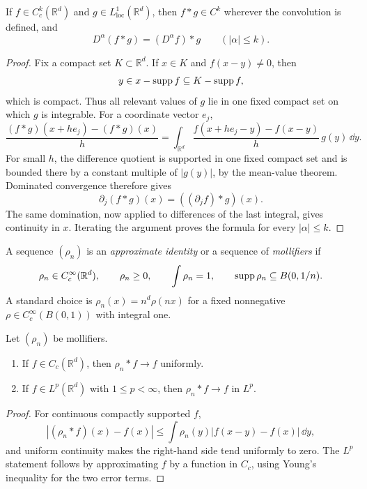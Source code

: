 \begin{noteproposition}
If $f\in C_c^k(\mathbb R^d)$ and $g\in L^1_{\mathrm{loc}}(\mathbb R^d)$,
then $f*g\in C^k$ wherever the convolution is defined, and
\[
  D^\alpha(f*g)=(D^\alpha f)*g
  \qquad(|\alpha|\le k).
\]
\end{noteproposition}

\begin{proof}
Fix a compact set $K\subset\mathbb R^d$.  If $x\in K$ and
$f(x-y)\ne0$, then
\[
  y\in x-\operatorname{supp} f\subseteq K-\operatorname{supp} f,
\]
which is compact.  Thus all relevant values of $g$ lie in one fixed compact
set on which $g$ is integrable.  For a coordinate vector $e_j$,
\[
  \frac{(f*g)(x+he_j)-(f*g)(x)}{h}
  =\int_{\mathbb R^d}
     \frac{f(x+he_j-y)-f(x-y)}{h}\,g(y)\,\dd y.
\]
For small $h$, the difference quotient is supported in one fixed compact set
and is bounded there by a constant multiple of $|g(y)|$, by the mean-value
theorem.  Dominated convergence therefore gives
\[
  \partial_j(f*g)(x)=((\partial_jf)*g)(x).
\]
The same domination, now applied to differences of the last integral, gives
continuity in $x$.  Iterating the argument proves the formula for every
$|\alpha|\le k$.
\end{proof}

\begin{notedefinition}
A sequence $(\rho_n)$ is an \emph{approximate identity} or a sequence of
\emph{mollifiers} if
\[
  \rho_n\in C_c^\infty(\mathbb R^d),\qquad
  \rho_n\ge0,
  \qquad
  \int\rho_n=1,
  \qquad
  \operatorname{supp}\rho_n\subseteq B(0,1/n).
\]
A standard choice is $\rho_n(x)=n^d\rho(nx)$ for a fixed nonnegative
$\rho\in C_c^\infty(B(0,1))$ with integral one.
\end{notedefinition}

\begin{noteproposition}
Let $(\rho_n)$ be mollifiers.
\begin{enumerate}
  \item If $f\in C_c(\mathbb R^d)$, then $\rho_n*f\to f$ uniformly.
  \item If $f\in L^p(\mathbb R^d)$ with $1\le p<\infty$, then
        $\rho_n*f\to f$ in $L^p$.
\end{enumerate}
\end{noteproposition}

\begin{proof}
For continuous compactly supported $f$,
\[
 |(\rho_n*f)(x)-f(x)|
 \le\int\rho_n(y)|f(x-y)-f(x)|\,\dd y,
\]
and uniform continuity makes the right-hand side tend uniformly to zero.  The
$L^p$ statement follows by approximating $f$ by a function in $C_c$, using
Young's inequality for the two error terms.
\end{proof}


